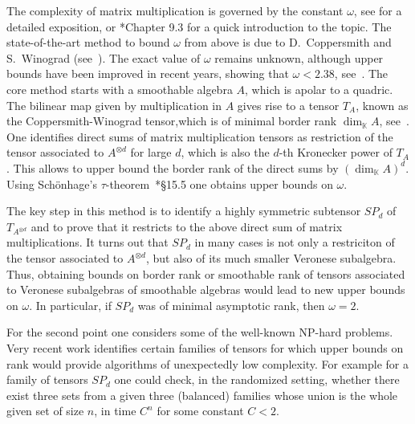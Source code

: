 \documentclass[a4paper,11pt,reqno]{amsart}
\newcommand{\bbK}{\mathbb{K}}
\numberwithin{equation}{section}
\theoremstyle{definition}
\theoremstyle{plain}
\theoremstyle{remark}
\begin{document}
The complexity of matrix multiplication is governed by the constant $\omega$, see \cites{BCS97, landsberg2017geometry} for a detailed exposition, or \cite{michalek2021invitation}*{Chapter 9.3} for a {quick} introduction to the topic.
 The {state-of-the-art} method to bound $\omega$ from above is due to
 D.~Coppersmith and S.~Winograd (see~\cite{CW}). The exact value of $\omega$ remains
 unknown, although upper bounds have been improved in recent years, showing
 that $\omega<2.38$, see~\cites{CW, alman2021refined, williams2023new, alman2024more}. The
 core method starts with a smoothable algebra $A$, which is apolar to a quadric.
 The bilinear map given by multiplication in $A$ gives rise to a tensor $T_A$,
 known as the Coppersmith-Winograd tensor,{which is} of minimal border rank
 $\dim_{\bbK} A$, see~\cite{BL16}. One identifies direct sums of
 matrix multiplication tensors as restriction of the tensor associated to
 $A^{\otimes d}$ for large $d$, which is also the $d$-th Kronecker power of
 $T_A$. This allows to upper bound the border rank of the direct sums by
 $(\dim_{\bbK}A)^d$. {Using} Sch\"onhage's $\tau$-theorem~\cite{BCS97}*{\S15.5} one obtains upper bounds
 on $\omega$.

 The key step in this method is to identify a highly symmetric subtensor $SP_d$ of $T_{A^{\otimes d}}$ and {to prove} that it restricts to the {above} direct sum of matrix multiplications. It turns out that $SP_d$ in many cases is not only a restriciton of the tensor associated to ${A^{\otimes d}}$, but also of its much smaller Veronese subalgebra. Thus, obtaining bounds on border rank or smoothable rank of tensors associated to Veronese subalgebras of smoothable algebras would lead to new upper bounds on $\omega$. In particular, if $SP_d$ was of minimal asymptotic rank, then $\omega=2$.

For the second point one considers some of the well-known NP-hard problems. {Very recent work \cites{bjorklund2023asymptotic, pratt2023stronger,
bjorklund2024chromatic} identifies certain} families of tensors for which
upper bounds on rank would provide algorithms of unexpectedly low
complexity. For example
for a family of tensors $SP_d$ {one could check, in the randomized setting, whether} there exist three sets from a given three (balanced) families whose union is the whole given set of size $n$, in time $C^n$ for {some} constant $C<2$.
\end{document}
